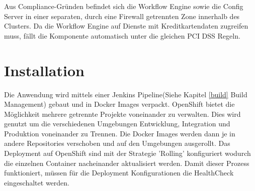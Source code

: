 Aus Compliance-Gründen befindet sich die Workflow Engine sowie die Config Server in einer separaten, durch eine Firewall getrennten Zone innerhalb des Clusters. Da die Workflow Engine auf Dienste mit Kreditkartendaten zugreifen muss, fällt die Komponente automatisch unter die gleichen PCI DSS Regeln. 

\section{Installation}

Die Anwendung wird mittels einer Jenkins Pipeline(Siehe Kapitel \ref{build} Build Management) gebaut und in Docker Images verpackt. OpenShift bietet die Möglichkeit mehrere getrennte Projekte voneinander zu verwalten. Dies wird genutzt um die verschiedenen Umgebungen Entwicklung, Integration und Produktion voneinander zu Trennen. Die Docker Images werden dann je in andere Repositories verschoben und auf den Umgebungen ausgerollt. {\color{red}Das Deployment auf OpenShift sind mit der Strategie 'Rolling' konfiguriert wodurch die einzelnen Container nacheinander aktualisiert werden. Damit dieser Prozess funktioniert, müssen für die Deployment Konfigurationen die HealthCheck eingeschaltet werden.}

